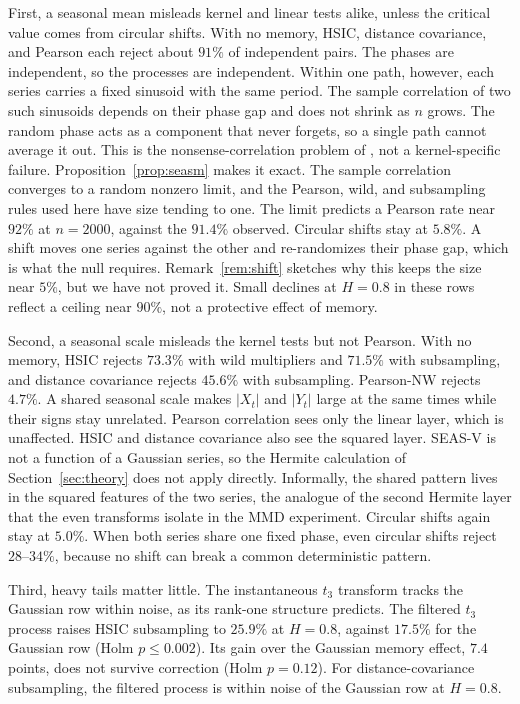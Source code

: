 \documentclass[11pt]{article}
\theoremstyle{remark}
\begin{document}
First, a seasonal mean misleads kernel and linear tests alike, unless the critical value comes from circular shifts. With no memory, HSIC, distance covariance, and Pearson each reject about $91\%$ of independent pairs. The phases are independent, so the processes are independent. Within one path, however, each series carries a fixed sinusoid with the same period. The sample correlation of two such sinusoids depends on their phase gap and does not shrink as $n$ grows. The random phase acts as a component that never forgets, so a single path cannot average it out. This is the nonsense-correlation problem of \citet{yule1926nonsense}, not a kernel-specific failure. Proposition~\ref{prop:seasm} makes it exact. The sample correlation converges to a random nonzero limit, and the Pearson, wild, and subsampling rules used here have size tending to one. The limit predicts a Pearson rate near $92\%$ at $n=2000$, against the $91.4\%$ observed. Circular shifts stay at $5.8\%$. A shift moves one series against the other and re-randomizes their phase gap, which is what the null requires. Remark~\ref{rem:shift} sketches why this keeps the size near $5\%$, but we have not proved it. Small declines at $H=0.8$ in these rows reflect a ceiling near $90\%$, not a protective effect of memory.

Second, a seasonal scale misleads the kernel tests but not Pearson. With no memory, HSIC rejects $73.3\%$ with wild multipliers and $71.5\%$ with subsampling, and distance covariance rejects $45.6\%$ with subsampling. Pearson-NW rejects $4.7\%$. A shared seasonal scale makes $|X_t|$ and $|Y_t|$ large at the same times while their signs stay unrelated. Pearson correlation sees only the linear layer, which is unaffected. HSIC and distance covariance also see the squared layer. SEAS-V is not a function of a Gaussian series, so the Hermite calculation of Section~\ref{sec:theory} does not apply directly. Informally, the shared pattern lives in the squared features of the two series, the analogue of the second Hermite layer that the even transforms isolate in the MMD experiment. Circular shifts again stay at $5.0\%$. When both series share one fixed phase, even circular shifts reject $28$--$34\%$, because no shift can break a common deterministic pattern.

Third, heavy tails matter little. The instantaneous $t_3$ transform tracks the Gaussian row within noise, as its rank-one structure predicts. The filtered $t_3$ process raises HSIC subsampling to $25.9\%$ at $H=0.8$, against $17.5\%$ for the Gaussian row (Holm $p\le0.002$). Its gain over the Gaussian memory effect, $7.4$ points, does not survive correction (Holm $p=0.12$). For distance-covariance subsampling, the filtered process is within noise of the Gaussian row at $H=0.8$.
\end{document}
